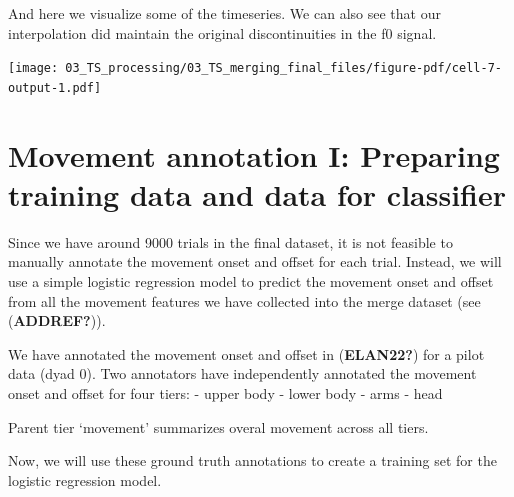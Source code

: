 \documentclass[
  letterpaper,
  DIV=11,
  numbers=noendperiod]{scrreprt}
\begin{document}
And here we visualize some of the timeseries. We can also see that our
interpolation did maintain the original discontinuities in the f0
signal.

\texttt{[image: 03\_TS\_processing/03\_TS\_merging\_final\_files/figure-pdf/cell-7-output-1.pdf]}


\chapter{Movement annotation I: Preparing training data and data for
classifier}\label{movement-annotation-i-preparing-training-data-and-data-for-classifier}

Since we have around 9000 trials in the final dataset, it is not
feasible to manually annotate the movement onset and offset for each
trial. Instead, we will use a simple logistic regression model to
predict the movement onset and offset from all the movement features we
have collected into the merge dataset (see (\textbf{ADDREF?})).

We have annotated the movement onset and offset in (\textbf{ELAN22?})
for a pilot data (dyad 0). Two annotators have independently annotated
the movement onset and offset for four tiers: - upper body - lower body
- arms - head

Parent tier `movement' summarizes overal movement across all tiers.

Now, we will use these ground truth annotations to create a training set
for the logistic regression model.
\end{document}
